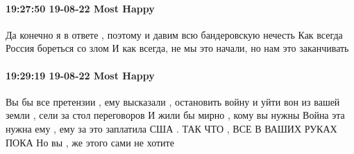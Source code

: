  
 
 
 
 

\paragraph{19:27:50 19-08-22 Most Happy}

Да конечно я в ответе , поэтому и давим всю бандеровскую нечесть
Как всегда Россия бореться со злом
И как всегда, не мы это начали, но нам это заканчивать

\paragraph{19:29:19 19-08-22 Most Happy}

Вы бы все претензии , ему высказали , остановить войну и уйти вон из вашей земли , сели за стол переговоров
И жили бы мирно , кому вы нужны
Война эта нужна ему , ему за это заплатила США . ТАК ЧТО , ВСЕ В ВАШИХ РУКАХ ПОКА
Но вы , же этого сами не хотите
